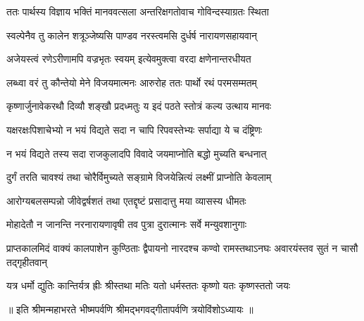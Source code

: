 
\twolineshloka
{ततः पार्थस्य विज्ञाय भक्तिं मानववत्सला}
{अन्तरिक्षगतोवाच गोविन्दस्याग्रतः स्थिता}


\twolineshloka
{स्वल्पेनैव तु कालेन शत्रूञ्जेष्यसि पाण्डव}
{नरस्त्वमसि दुर्धर्ष नारायणसहायवान्}

\twolineshloka
{अजेयस्त्वं रणेऽरीणामपि वज्रभृतः स्वयम्}
{इत्येवमुक्त्वा वरदा क्षणेनान्तरधीयत}

\twolineshloka
{लब्ध्वा वरं तु कौन्तेयो मेने विजयमात्मनः}
{आरुरोह ततः पार्थो रथं परमसम्मतम्}

\twolineshloka
{कृष्णार्जुनावेकरथौ दिव्यौ शङ्खौ प्रदध्मतुः}
{य इदं पठते स्तोत्रं कल्य उत्थाय मानवः}

\twolineshloka
{यक्षरक्षःपिशाचेभ्यो न भयं विद्यते सदा}
{न चापि रिपवस्तेभ्यः सर्पाद्या ये च दंष्ट्रिणः}

\twolineshloka
{न भयं विद्यते तस्य सदा राजकुलादपि}
{विवादे जयमाप्नोति बद्धो मुच्यति बन्धनात्}

\twolineshloka
{दुर्गं तरति चावश्यं तथा चोरैर्विमुच्यते}
{सङ्ग्रामे विजयेन्नित्यं लक्ष्मीं प्राप्नोति केवलाम्}

\twolineshloka
{आरोग्यबलसम्पन्नो जीवेद्वर्षशतं तथा}
{एतद्दृष्टं प्रसादात्तु मया व्यासस्य धीमतः}

\twolineshloka
{मोहादेतौ न जानन्ति नरनारायणावृषी}
{तव पुत्रा दुरात्मानः सर्वे मन्युवशानुगाः}


\threelineshloka
{प्राप्तकालमिदं वाक्यं कालपाशेन कुण्ठिताः}
{द्वैपायनो नारदश्च कण्वो रामस्तथाऽनघः}
{अवारयंस्तव सुतं न चासौ तद्गृहीतवान्}

\twolineshloka
{यत्र धर्मो द्युतिः कान्तिर्यत्र ह्रीः श्रीस्तथा मतिः}
{यतो धर्मस्ततः कृष्णो यतः कृष्णस्ततो जयः}

॥ इति श्रीमन्महाभरते भीष्मपर्वणि श्रीमद्भगवद्गीतापर्वणि
त्रयोविंशोऽध्यायः ॥
